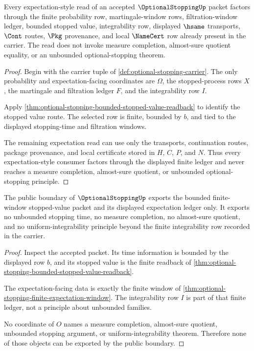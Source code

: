 \begin{theorem}
\label{thm:optional-stopping-finite-expectation-window}
Every expectation-style read of an accepted $\OptionalStoppingUp$ packet factors through the finite probability row, martingale-window rows, filtration-window ledger, bounded stopped value, integrability row, displayed $\hsame$ transports, $\Cont$ routes, $\Pkg$ provenance, and local $\NameCert$ row already present in the carrier. The read does not invoke measure completion, almost-sure quotient equality, or an unbounded optional-stopping theorem.
\end{theorem}
\begin{proof}
Begin with the carrier tuple of \autoref{def:optional-stopping-carrier}. The only probability and expectation-facing coordinates are $\Omega$, the stopped-process rows $X$, the martingale and filtration ledger $F$, and the integrability row $I$.

Apply \autoref{thm:optional-stopping-bounded-stopped-value-readback} to identify the stopped value route. The selected row is finite, bounded by $b$, and tied to the displayed stopping-time and filtration windows.

The remaining expectation read can use only the transports, continuation routes, package provenance, and local certificate stored in $H$, $C$, $P$, and $N$. Thus every expectation-style consumer factors through the displayed finite ledger and never reaches a measure completion, almost-sure quotient, or unbounded optional-stopping principle.
\end{proof}

\begin{theorem}
\label{thm:optional-stopping-no-escape-boundary}
The public boundary of $\OptionalStoppingUp$ exports the bounded finite-window stopped-value packet and its displayed expectation ledger only. It exports no unbounded stopping time, no measure completion, no almost-sure quotient, and no uniform-integrability principle beyond the finite integrability row recorded in the carrier.
\end{theorem}
\begin{proof}
Inspect the accepted packet. Its time information is bounded by the displayed row $b$, and its stopped value is the finite readback of \autoref{thm:optional-stopping-bounded-stopped-value-readback}.

The expectation-facing data is exactly the finite window of \autoref{thm:optional-stopping-finite-expectation-window}. The integrability row $I$ is part of that finite ledger, not a principle about unbounded families.

No coordinate of $O$ names a measure completion, almost-sure quotient, unbounded stopping argument, or uniform-integrability theorem. Therefore none of those objects can be exported by the public boundary.
\end{proof}

